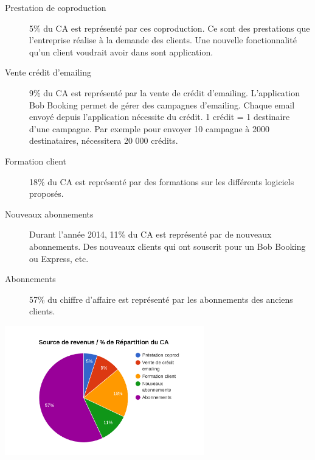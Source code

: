 \begin{minipage}{.6\textwidth}
    \begin{description}
        \item[Prestation de coproduction]
        {5\% du CA est représenté par ces coproduction. 
        Ce sont des prestations que l'entreprise réalise à la demande des clients. Une nouvelle         fonctionnalité qu'un client voudrait avoir dans sont application.
        }
        \item[Vente crédit d'emailing]
        {9\% du CA est représenté par la vente de crédit d'emailing. 
        L'application Bob Booking permet de gérer des campagnes d'emailing. 
        Chaque email envoyé depuis l'application nécessite du crédit. 1 crédit = 1 destinaire d'une campagne. 
        Par exemple pour envoyer 10 campagne à 2000 destinataires, nécessitera 20 000 crédits. 
        }
        \item[Formation client]
        {18\% du CA est représenté par des formations sur les différents logiciels proposés. 
        }
        \item[Nouveaux abonnements]
        {
        Durant l'année 2014, 11\% du CA est représenté par de nouveaux abonnements. Des nouveaux         clients qui ont souscrit pour un Bob Booking ou Express, etc. 
        }
        \item[Abonnements]
        {
        57\% du chiffre d'affaire est représenté par les abonnements des anciens clients. 
        }
        
    \end{description}
\end{minipage}%
\begin{minipage}{1\textwidth}
    \includegraphics[width=0.65\textwidth]{assets/repartition_ca.png}
\end{minipage}



